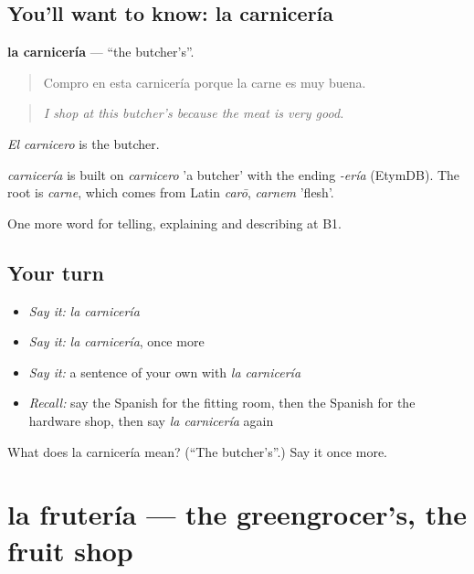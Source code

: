 \subsection*{You'll want to know: la carnicería}
\textbf{la carnicería} — \textquotedblleft{}the butcher's\textquotedblright{}.

\begin{quote}
Compro en esta carnicería porque la carne es muy buena.
\end{quote}

\begin{quote}
\emph{I shop at this butcher's because the meat is very good.}
\end{quote}

\emph{El carnicero} is the butcher.

\begin{cousinweb}
\emph{carnicería} is built on \emph{carnicero} 'a butcher' with the ending \emph{-ería} (EtymDB). The root is \emph{carne}, which comes from Latin \emph{carō}, \emph{carnem} 'flesh'.
\end{cousinweb}

\begin{grammarlens}[title={What you've built}]
One more word for telling, explaining and describing at B1.
\end{grammarlens}

\subsection*{Your turn}
\begin{itemize}
\raggedright
  \item \emph{Say it:} \emph{la carnicería}
  \item \emph{Say it:} \emph{la carnicería}, once more
  \item \emph{Say it:} a sentence of your own with \emph{la carnicería}
  \item \emph{Recall:} say the Spanish for the fitting room, then the Spanish for the hardware shop, then say \emph{la carnicería} again
\end{itemize}

\begin{tcolorbox}[breakable,colback=teal!4,colframe=teal!35!black,title={Before you move on}]
What does la carnicería mean? (\textquotedblleft{}The butcher's\textquotedblright{}.) Say it once more.
\end{tcolorbox}
\section[la frutería]{la frutería — the greengrocer's, the fruit shop}

